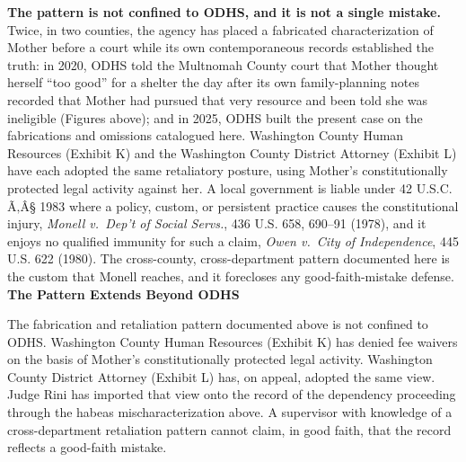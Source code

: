 \documentclass[10pt,a4paper,roman]{moderncv}
\begin{document}
\begin{enumerate}[leftmargin=*,itemsep=0.35em,topsep=0.3em,resume]
\textbf{The pattern is not confined to ODHS, and it is not a single mistake.} Twice, in two counties, the agency has placed a fabricated characterization of Mother before a court while its own contemporaneous records established the truth: in 2020, ODHS told the Multnomah County court that Mother thought herself ``too good'' for a shelter the day after its own family-planning notes recorded that Mother had pursued that very resource and been told she was ineligible (Figures above); and in 2025, ODHS built the present case on the fabrications and omissions catalogued here. Washington County Human Resources (Exhibit K) and the Washington County District Attorney (Exhibit L) have each adopted the same retaliatory posture, using Mother's constitutionally protected legal activity against her. A local government is liable under 42 U.S.C. Ã‚Â§ 1983 where a policy, custom, or persistent practice causes the constitutional injury, \emph{Monell v.~Dep't of Social Servs.}, 436 U.S. 658, 690--91 (1978), and it enjoys no qualified immunity for such a claim, \emph{Owen v.~City of Independence}, 445 U.S. 622 (1980). The cross-county, cross-department pattern documented here is the custom that Monell reaches, and it forecloses any good-faith-mistake defense.\\

\textbf{The Pattern Extends Beyond ODHS}

The fabrication and retaliation pattern documented above is not confined to ODHS. Washington County Human Resources (Exhibit K) has denied fee waivers on the basis of Mother's constitutionally protected legal activity. Washington County District Attorney (Exhibit L) has, on appeal, adopted the same view. Judge Rini has imported that view onto the record of the dependency proceeding through the habeas mischaracterization above. A supervisor with knowledge of a cross-department retaliation pattern cannot claim, in good faith, that the record reflects a good-faith mistake.

\bigskip


\end{enumerate}
\end{document}

